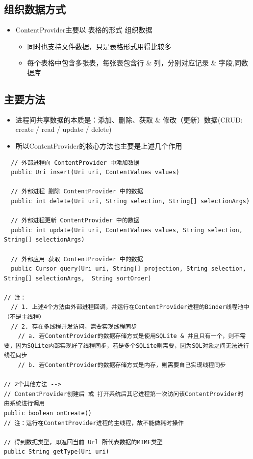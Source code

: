 \documentclass[9pt, b5paaper]{book}
\begin{document}
\subsection{组织数据方式}
\label{sec-5-3-1}
\begin{itemize}
\item ContentProvider主要以 表格的形式 组织数据
\begin{itemize}
\item 同时也支持文件数据，只是表格形式用得比较多
\item 每个表格中包含多张表，每张表包含行 \& 列，分别对应记录 \& 字段,同数据库
\end{itemize}
\end{itemize}
\subsection{主要方法}
\label{sec-5-3-2}
\begin{itemize}
\item 进程间共享数据的本质是：添加、删除、获取 \& 修改（更新）数据(CRUD: create / read / update / delete)
\item 所以ContentProvider的核心方法也主要是上述几个作用
\end{itemize}
\begin{verbatim}
  // 外部进程向 ContentProvider 中添加数据
  public Uri insert(Uri uri, ContentValues values) 

  // 外部进程 删除 ContentProvider 中的数据
  public int delete(Uri uri, String selection, String[] selectionArgs) 

  // 外部进程更新 ContentProvider 中的数据
  public int update(Uri uri, ContentValues values, String selection, String[] selectionArgs)

  // 外部应用 获取 ContentProvider 中的数据
  public Cursor query(Uri uri, String[] projection, String selection, String[] selectionArgs,  String sortOrder)　 

// 注：
  // 1. 上述4个方法由外部进程回调，并运行在ContentProvider进程的Binder线程池中（不是主线程）
  // 2. 存在多线程并发访问，需要实现线程同步
    // a. 若ContentProvider的数据存储方式是使用SQLite & 并且只有一个，则不需要，因为SQLite内部实现好了线程同步，若是多个SQLite则需要，因为SQL对象之间无法进行线程同步
    // b. 若ContentProvider的数据存储方式是内存，则需要自己实现线程同步

// 2个其他方法 -->
// ContentProvider创建后 或 打开系统后其它进程第一次访问该ContentProvider时 由系统进行调用
public boolean onCreate() 
// 注：运行在ContentProvider进程的主线程，故不能做耗时操作

// 得到数据类型，即返回当前 Url 所代表数据的MIME类型
public String getType(Uri uri)
\end{verbatim}
\end{document}
